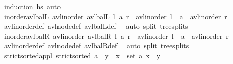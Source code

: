 \begin{isabellebody}
\ {\isacharparenleft}{\kern0pt}induction\ hs\ auto\isanewline
\ \ \isamarkupfalse%
%
\endisatagproof
{\isafoldproof}%
%
\isadelimproof
\isanewline
%
\endisadelimproof
\isanewline
\ \ \isamarkupfalse%
\ inorder{\isacharunderscore}{\kern0pt}avl{\isacharunderscore}{\kern0pt}balL{\isacharcolon}{\kern0pt}\ {\isachardoublequoteopen}avl{\isacharunderscore}{\kern0pt}inorder\ {\isacharparenleft}{\kern0pt}avl{\isacharunderscore}{\kern0pt}balL\ l\ a\ r{\isacharparenright}{\kern0pt}\ {\isacharequal}{\kern0pt}\ avl{\isacharunderscore}{\kern0pt}inorder\ l\ {\isacharat}{\kern0pt}\ a\ {\isacharhash}{\kern0pt}\ avl{\isacharunderscore}{\kern0pt}inorder\ r{\isachardoublequoteclose}\isanewline
%
\isadelimproof
\ \ \ \ %
\endisadelimproof
%
\isatagproof
{}\isamarkupfalse%
\ avl{\isacharunderscore}{\kern0pt}inorder{\isacharunderscore}{\kern0pt}def\ avl{\isacharunderscore}{\kern0pt}node{\isacharunderscore}{\kern0pt}def\ avl{\isacharunderscore}{\kern0pt}balL{\isacharunderscore}{\kern0pt}def\ \isamarkupfalse%
\ {\isacharparenleft}{\kern0pt}auto\ split{\isacharcolon}{\kern0pt}\ tree{\isachardot}{\kern0pt}splits{\isacharparenright}{\kern0pt}%
\endisatagproof
{\isafoldproof}%
%
\isadelimproof
\isanewline
%
\endisadelimproof
\isanewline
\ \ \isamarkupfalse%
\ inorder{\isacharunderscore}{\kern0pt}avl{\isacharunderscore}{\kern0pt}balR{\isacharcolon}{\kern0pt}\ {\isachardoublequoteopen}avl{\isacharunderscore}{\kern0pt}inorder\ {\isacharparenleft}{\kern0pt}avl{\isacharunderscore}{\kern0pt}balR\ l\ a\ r{\isacharparenright}{\kern0pt}\ {\isacharequal}{\kern0pt}\ avl{\isacharunderscore}{\kern0pt}inorder\ l\ {\isacharat}{\kern0pt}\ a\ {\isacharhash}{\kern0pt}\ avl{\isacharunderscore}{\kern0pt}inorder\ r{\isachardoublequoteclose}\isanewline
%
\isadelimproof
\ \ \ \ %
\endisadelimproof
%
\isatagproof
{}\isamarkupfalse%
\ avl{\isacharunderscore}{\kern0pt}inorder{\isacharunderscore}{\kern0pt}def\ avl{\isacharunderscore}{\kern0pt}node{\isacharunderscore}{\kern0pt}def\ avl{\isacharunderscore}{\kern0pt}balR{\isacharunderscore}{\kern0pt}def\ \isamarkupfalse%
\ {\isacharparenleft}{\kern0pt}auto\ split{\isacharcolon}{\kern0pt}\ tree{\isachardot}{\kern0pt}splits{\isacharparenright}{\kern0pt}%
\endisatagproof
{\isafoldproof}%
%
\isadelimproof
\isanewline
%
\endisadelimproof
\isanewline
\ \ \isanewline
\isanewline
\ \ \isamarkupfalse%
\ strict{\isacharunderscore}{\kern0pt}sorted{\isacharunderscore}{\kern0pt}appl{\isacharcolon}{\kern0pt}\ {\isachardoublequoteopen}strict{\isacharunderscore}{\kern0pt}sorted\ {\isacharparenleft}{\kern0pt}a\ {\isacharat}{\kern0pt}\ {\isacharbrackleft}{\kern0pt}y{\isacharbrackright}{\kern0pt}{\isacharparenright}{\kern0pt}\ {\isasymLongrightarrow}\ {\isasymforall}x\ {\isasymin}\ set\ a{\isachardot}{\kern0pt}\ x\ {\isacharless}{\kern0pt}\ y{\isachardoublequoteclose}\isanewline

\end{isabellebody}
